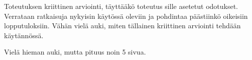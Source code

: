 Toteutuksen kriittinen arviointi, täyttääkö toteutus sille asetetut odotukset. Verrataan ratkaisuja nykyisin käytössä oleviin ja pohdintaa päästiinkö oikeisiin lopputuloksiin. Vähän vielä auki, miten tällainen kriittinen arviointi tehdään käytännössä.

Vielä hieman auki, mutta pituus noin 5 sivua.
